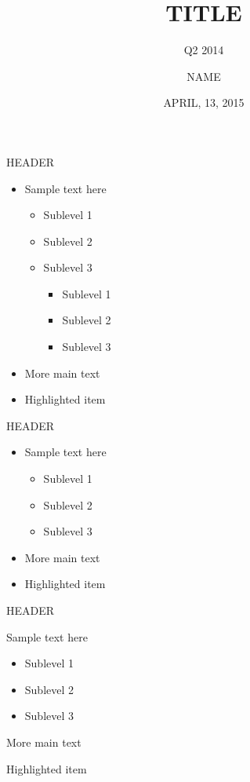 \documentclass{beamer}
\title[Percona Common Template]{TITLE}
\subtitle{Q2 2014}
\author{NAME}
\institute{TITLE}
\date{APRIL, 13, 2015}
\begin{document}
	
	\begin{frame}
		\titlepage
	\end{frame}
	
	\note{some note}
	
	
	\begin{frame}{HEADER}
		\begin{itemize} 
			\item Sample text here
			\begin{itemize}
				\item Sublevel 1
				\item Sublevel 2
				\item Sublevel 3
				
				\begin{itemize}
					\item Sublevel 1
					\item Sublevel 2
					\item Sublevel 3
				\end{itemize}
			\end{itemize}
			\item More main text
			\item \alert{Highlighted item}
		\end{itemize}
	\end{frame}
	
	
	
	\begin{frame}{HEADER}
		\begin{itemize} 
			\item Sample text here
			\begin{itemize}
				\item Sublevel 1
				\item Sublevel 2
				\item Sublevel 3
			\end{itemize}
			\item More main text
			\item \alert{Highlighted item}
		\end{itemize}
	\end{frame}
	
	\begin{frame}{HEADER}
		\begin{vfilleditems}
			\item Sample text here
			\begin{itemize}
				\item Sublevel 1
				\item Sublevel 2
				\item Sublevel 3
			\end{itemize}
			\item More main text
			\item \alert{Highlighted item}
		\end{vfilleditems}
	\end{frame}
		
\end{document}
